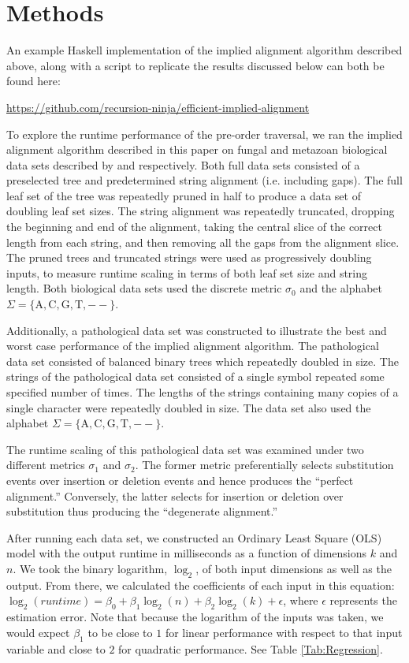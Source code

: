 \documentclass{bmcart}
\begin{document}
\section*{Methods}

An example Haskell implementation of the implied alignment algorithm described above, along with a script to replicate the results discussed below can both be found here: 

\centerline{\url{https://github.com/recursion-ninja/efficient-implied-alignment}}

To explore the runtime performance of the pre-order traversal, we ran the implied alignment algorithm described in this paper on fungal and metazoan biological data sets described by \cite{GiribetandWheeler1999} and \cite{GiribetandWheeler2001} respectively.
Both full data sets consisted of a preselected tree and predetermined string alignment (i.e. including gaps).
The full leaf set of the tree was repeatedly pruned in half to produce a data set of doubling leaf set sizes.
The string alignment was repeatedly truncated, dropping the beginning and end of the alignment, taking the central slice of the correct length from each string, and then removing all the gaps from the alignment slice.
The pruned trees and truncated strings were used as progressively doubling inputs, to measure runtime scaling in terms of both leaf set size and string length.
Both biological data sets used the discrete metric $\sigma_0$ and the alphabet $\Sigma = \{\mathrm{A, C, G, T, --} \}$.

Additionally, a pathological data set was constructed to illustrate the best and worst case performance of the implied alignment algorithm.
The pathological data set consisted of balanced binary trees which repeatedly doubled in size.
The strings of the pathological data set consisted of a single symbol repeated some specified number of times.
The lengths of the strings containing many copies of a single character were repeatedly doubled in size.
The data set also used the alphabet $\Sigma = \{\mathrm {A, C, G, T, --} \}$.

The runtime scaling of this pathological data set was examined under two different metrics $\sigma_1$ and $\sigma_2$.
The former metric preferentially selects substitution events over insertion or deletion events and hence produces the ``perfect alignment.''
Conversely, the latter selects for insertion or deletion over substitution thus producing the ``degenerate alignment.''


After running each data set, we constructed an Ordinary Least Square (OLS) model with the output runtime in milliseconds as a function of dimensions $k$ and $n$.
We took the binary logarithm, $\log_{2}$, of both input dimensions as well as the output.
From there, we calculated the coefficients of each input in this equation: $\log_2(runtime) = \beta_0 + \beta_1 \log_2(n) + \beta_2 \log_2(k) + \epsilon$, where $\epsilon$ represents the estimation error.
Note that because the logarithm of the inputs was taken, we would expect $\beta_1$ to be close to $1$ for linear performance with respect to that input variable and close to $2$ for quadratic performance.
See Table \ref{Tab:Regression}.
\end{document}
